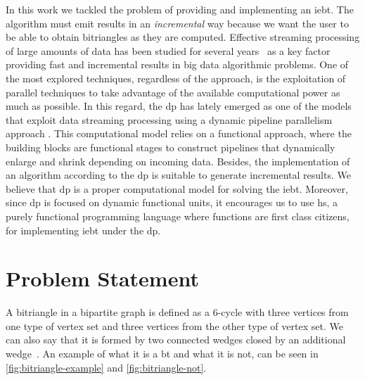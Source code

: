 In this work we tackled the problem of providing and implementing an \acrfull{iebt}. The algorithm must emit  results in an \emph{incremental} way because we want the user to be able to obtain bitriangles as they are computed.   
Effective streaming processing of large amounts of data has been studied for several years~\cite{enumeratingsg, exploiting, onthefly} as a key factor providing fast and incremental results in big data algorithmic problems. 
One of the most explored techniques, regardless of the approach, is the exploitation of parallel techniques to take advantage of the available computational power as much as possible. 
In this regard, the \acrfull{dp} \cite{dpdef} has lately emerged as one of the models that exploit data streaming processing using a dynamic pipeline parallelism approach \cite{onthefly}. 
This computational model relies on a functional approach, where the building blocks are functional stages to construct pipelines that dynamically enlarge and shrink depending on incoming data.  Besides,  the implementation of an algorithm according to the \acrshort{dp} is suitable to generate incremental results. 
We believe that \acrshort{dp} is a proper computational model for solving the \acrshort{iebt}. Moreover, since   \acrshort{dp} is focused on dynamic functional units, it encourages us to use \acrlong{hs}, a purely functional programming language where functions are first class citizens, for implementing \acrshort{iebt} under the  \acrshort{dp}.

\section{Problem Statement}
A bitriangle in a bipartite graph is defined as a 6-cycle with three vertices from one type of vertex set and three vertices from the other type of vertex set. We can also say that it is formed by two connected wedges closed by an additional wedge~\cite{btcount}.
An example of what it is a \acrfull{bt} and what it is not, can be seen in \autoref{fig:bitriangle-example} and \autoref{fig:bitriangle-not}.

